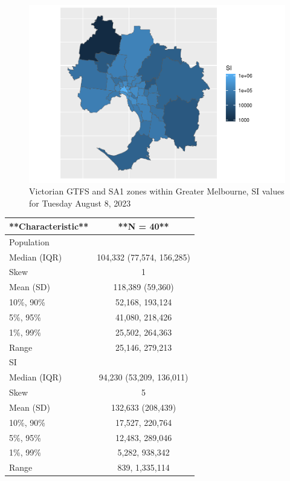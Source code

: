\documentclass[preprint, 3p,
authoryear]{elsarticle} %
\begin{document}
\begin{figure}
\centering
\includegraphics{Leveraging_GTFS_to_assess_transit_supply_Transport_Geography_files/figure-latex/gghistostats_greater_melbourne_230808_by_sa3-1.pdf}
\caption{Victorian GTFS and SA1 zones within Greater Melbourne, SI
values for Tuesday August 8, 2023}
\end{figure}

\begin{tabular}{l|c}
\hline
**Characteristic** & **N = 40**\\
\hline
Population & \\
\hline
Median (IQR) & 104,332 (77,574, 156,285)\\
\hline
Skew & 1\\
\hline
Mean (SD) & 118,389 (59,360)\\
\hline
10\%, 90\% & 52,168, 193,124\\
\hline
5\%, 95\% & 41,080, 218,426\\
\hline
1\%, 99\% & 25,502, 264,363\\
\hline
Range & 25,146, 279,213\\
\hline
SI & \\
\hline
Median (IQR) & 94,230 (53,209, 136,011)\\
\hline
Skew & 5\\
\hline
Mean (SD) & 132,633 (208,439)\\
\hline
10\%, 90\% & 17,527, 220,764\\
\hline
5\%, 95\% & 12,483, 289,046\\
\hline
1\%, 99\% & 5,282, 938,342\\
\hline
Range & 839, 1,335,114\\
\hline
\end{tabular}
\end{document}
